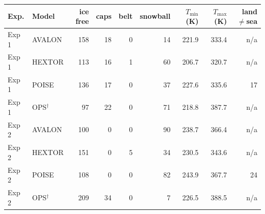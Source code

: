 \small
\begin{tabular}{llrrrrrrr}
\toprule
Exp. & Model & ice free & caps & belt & snowball & $T_{\min}$ (K) & $T_{\max}$ (K) & land$\ne$sea \\
\midrule
Exp 1 & AVALON & 158 & 18 & 0 & 14 & 221.9 & 333.4 & n/a \\
Exp 1 & HEXTOR & 113 & 16 & 1 & 60 & 206.7 & 320.7 & n/a \\
Exp 1 & POISE & 136 & 17 & 0 & 37 & 227.6 & 335.6 & 17 \\
Exp 1 & OPS$^\dagger$ & 97 & 22 & 0 & 71 & 218.8 & 387.7 & n/a \\
\addlinespace
Exp 2 & AVALON & 100 & 0 & 0 & 90 & 238.7 & 366.4 & n/a \\
Exp 2 & HEXTOR & 151 & 0 & 5 & 34 & 230.5 & 343.6 & n/a \\
Exp 2 & POISE & 108 & 0 & 0 & 82 & 243.9 & 367.7 & 24 \\
Exp 2 & OPS$^\dagger$ & 209 & 34 & 0 & 7 & 226.5 & 388.5 & n/a \\
\bottomrule
\end{tabular}
